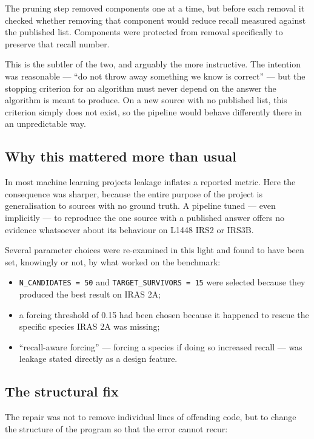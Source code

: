 \documentclass[11pt,a4paper]{article}
\newcommand{\code}[1]{\texttt{\small #1}}
\begin{document}
The pruning step removed components one at a time, but before each removal
it checked whether removing that component would reduce recall measured
against the published list. Components were protected from removal
specifically to preserve that recall number.

This is the subtler of the two, and arguably the more instructive. The
intention was reasonable --- ``do not throw away something we know is
correct'' --- but the stopping criterion for an algorithm must never depend
on the answer the algorithm is meant to produce. On a new source with no
published list, this criterion simply does not exist, so the pipeline would
behave differently there in an unpredictable way.

\subsection{Why this mattered more than usual}

In most machine learning projects leakage inflates a reported metric. Here
the consequence was sharper, because the entire purpose of the project is
generalisation to sources with no ground truth. A pipeline tuned --- even
implicitly --- to reproduce the one source with a published answer offers
no evidence whatsoever about its behaviour on L1448 IRS2 or IRS3B.

Several parameter choices were re-examined in this light and found to have
been set, knowingly or not, by what worked on the benchmark:

\begin{itemize}
  \item \code{N\_CANDIDATES = 50} and \code{TARGET\_SURVIVORS = 15} were
        selected because they produced the best result on IRAS 2A;
  \item a forcing threshold of 0.15 had been chosen because it happened to
        rescue the specific species IRAS 2A was missing;
  \item ``recall-aware forcing'' --- forcing a species if doing so
        increased recall --- was leakage stated directly as a design
        feature.
\end{itemize}

\subsection{The structural fix}

The repair was not to remove individual lines of offending code, but to
change the structure of the program so that the error cannot recur:
\end{document}
